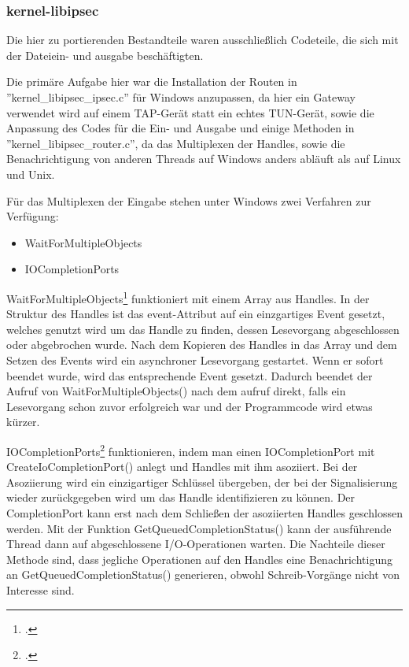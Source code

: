 \subsubsection{kernel-libipsec}
Die hier zu portierenden Bestandteile waren ausschließlich Codeteile, die
sich mit der Dateiein- und ausgabe beschäftigten.

Die primäre Aufgabe hier war die Installation der Routen in ''kernel\_libipsec\_ipsec.c''
für Windows anzupassen, da hier ein Gateway verwendet wird auf einem TAP-Gerät
statt ein echtes TUN-Gerät, sowie die Anpassung des Codes für die Ein- und Ausgabe 
und einige Methoden in
''kernel\_libipsec\_router.c'', da das Multiplexen der Handles, sowie die Benachrichtigung
von anderen Threads auf Windows anders abläuft als auf Linux und Unix.

Für das Multiplexen der Eingabe stehen unter Windows zwei Verfahren zur Verfügung:
\begin{itemize}
\item WaitForMultipleObjects
\item IOCompletionPorts
\end{itemize}

WaitForMultipleObjects\footcite[][]{_waitformultipleobjects_????} funktioniert mit einem Array aus Handles. In der Struktur des Handles
ist das event-Attribut auf ein einzgartiges Event gesetzt, welches genutzt wird um
das Handle zu finden, dessen Lesevorgang abgeschlossen oder abgebrochen wurde.
Nach dem Kopieren des Handles in das Array und dem Setzen des Events wird ein asynchroner
Lesevorgang gestartet. Wenn er sofort beendet wurde, wird das entsprechende Event gesetzt.
Dadurch beendet der Aufruf von WaitForMultipleObjects() nach dem aufruf direkt, falls
ein Lesevorgang schon zuvor erfolgreich war und der Programmcode wird etwas kürzer.

IOCompletionPorts\footcite[][]{_createiocompletionport_????} funktionieren, indem man einen IOCompletionPort mit CreateIoCompletionPort()
anlegt und Handles mit ihm asoziiert. Bei der Asoziierung wird ein einzigartiger Schlüssel
übergeben, der bei der Signalisierung wieder zurückgegeben wird um das Handle identifizieren zu können.
Der CompletionPort kann erst nach dem Schließen der asoziierten Handles geschlossen werden.
Mit der Funktion GetQueuedCompletionStatus() kann der ausführende Thread dann auf abgeschlossene
I/O-Operationen warten.
Die Nachteile dieser Methode sind, dass jegliche Operationen auf den Handles eine Benachrichtigung
an GetQueuedCompletionStatus() generieren, obwohl Schreib-Vorgänge nicht von Interesse sind.

